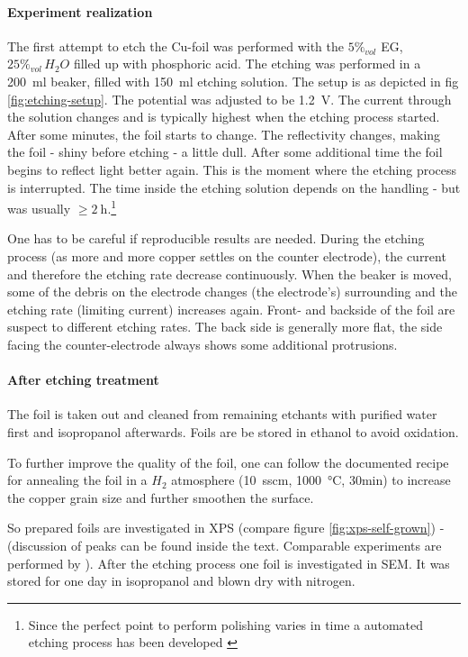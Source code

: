 
\paragraph{Experiment realization}The first attempt to etch the Cu-foil was performed with the $5\%_{vol}$ EG, $25\%_{vol}\,H_2O$ filled up with phosphoric acid. The etching was performed in a \SI{200}{\ml} beaker, filled with \SI{150}{\ml} etching solution. The setup is as depicted in fig \ref{fig:etching-setup}. The potential was adjusted to be \SI{1.2}{\V}. The current through the solution changes and is typically highest when the etching process started. After some minutes, the foil starts to change. The reflectivity changes, making the foil - shiny before etching - a little dull. After some additional time the foil begins to reflect light better again. This is the moment where the etching process is interrupted. The time inside the etching solution depends on the handling - but was usually $\geq \SI{2}{\hour}$.\footnote{Since the perfect point to perform polishing varies in time a automated etching process has been developed \cite{palmieri_besides_2001}}

One has to be careful if reproducible results are needed. During the etching process (as more and more copper settles on the counter electrode), the current and therefore the etching rate decrease continuously. When the beaker is moved, some of the debris on the electrode changes (the electrode's) surrounding and the etching rate (limiting current) increases again. Front- and backside of the foil are suspect to different etching rates. The back side is generally more flat, the side facing the counter-electrode always shows some additional protrusions.

\paragraph{After etching treatment}
The foil is taken out and cleaned from remaining etchants with purified water first and isopropanol afterwards. Foils are be stored in ethanol to avoid oxidation. 

To further improve the quality of the foil, one can follow the documented recipe for annealing the foil in a $H_2$ atmosphere (\SI{10}{sscm}, \SI{1000}{\celsius}, 30min)\cite{kim_synthesis_2012} to increase the copper grain size and further smoothen the surface. 

So prepared foils are investigated in XPS (compare figure \ref{fig:xps-self-grown}) - (discussion of peaks can be found inside the text. Comparable experiments  are performed by \cite[8]{stables_report_2008}).
After the etching process one foil is investigated in SEM. It was stored for one day in isopropanol and blown dry with nitrogen. 


